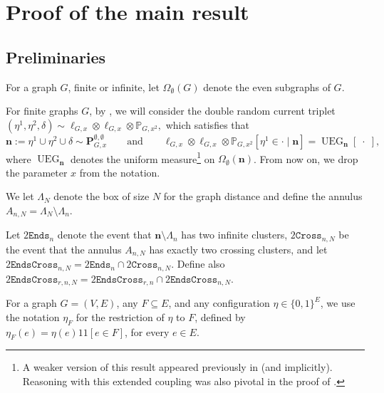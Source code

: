 \documentclass[article,11pt,reqno]{amsart}
\DeclareMathOperator*{\UEG}{UEG}
\newcommand{\id}{1\! \!1}
\newcommand{\nn}{\mathbf{n}}
\begin{document}
\section{Proof of the main result}


\subsection{Preliminaries}
For a graph $G$, finite or infinite, let $\Omega_\emptyset(G)$ denote the even subgraphs of $G$.


For finite graphs $G$, by \cite[Proposition 2.2]{hansen2025general}, we will consider the double random current triplet $(\eta^1,\eta^2,\delta)\sim \ell_{G,x}\otimes \ell_{G,x}\otimes \mathbb{P}_{G,x^2},$ which satisfies that 
$$
\nn:=\eta^1\cup\eta^2\cup\delta\sim \mathbf{P}^{\emptyset,\emptyset}_{G,x} \qquad \mathrm{and}\qquad  \ell_{G,x}\otimes \ell_{G,x}\otimes \mathbb{P}_{G,x^2}[\eta^1 \in \cdot\mid \nn]={\UEG}_{\nn}[\;\cdot\;],
$$
where $\UEG_{\nn}$ denotes the uniform measure\footnote{A weaker version of this result appeared previously in \cite{klausen2021monotonicity} (and \cite{lis2017planar} implicitly). Reasoning with this extended coupling was also pivotal in the
 proof of \cite[Proposition 2.12]{lopez2026ising}.} on $\Omega_{\emptyset}(\nn)$.
From now on, we drop the parameter $x$ from the notation.



We let $\Lambda_N$ denote the box of size $N$ for the graph distance and define the annulus $A_{n,N} = \Lambda_N \setminus \Lambda_n$.


Let $2\mathtt{Ends}_n$ denote the event that $\nn \setminus \Lambda_n$ has two infinite clusters, $2\mathtt{Cross}_{n,N}$ be the event that the annulus $A_{n,N}$ has exactly two crossing clusters, and let $2\mathtt{EndsCross}_{n,N}=2\mathtt{Ends}_n \cap 2\mathtt{Cross}_{n,N}.$ Define also $2\mathtt{EndsCross}_{r,n,N} = 2\mathtt{EndsCross}_{r,n} \cap 2\mathtt{EndsCross}_{n,N}$. 

For a graph $G=(V,E)$,  any $F \subseteq E$, and any configuration $\eta \in \{0,1\}^E$, we use the notation $\eta_F$ for the restriction of $\eta$ to $F$, defined by $\eta_F(e) = \eta(e)\id[e\in F]$, for every $e\in E$.
\end{document}
